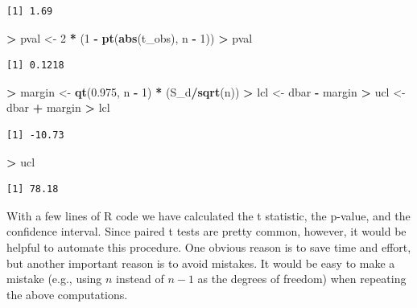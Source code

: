\documentclass[]{krantz}
\makeatletter
\newenvironment{Shaded}{\begin{snugshade}}{\end{snugshade}}
\newcommand{\DecValTok}[1]{\textcolor[rgb]{0.06,0.06,0.06}{#1}}
\newcommand{\FloatTok}[1]{\textcolor[rgb]{0.06,0.06,0.06}{#1}}
\newcommand{\KeywordTok}[1]{\textcolor[rgb]{0.27,0.27,0.27}{\textbf{#1}}}
\newcommand{\NormalTok}[1]{#1}
\newcommand{\OperatorTok}[1]{\textcolor[rgb]{0.43,0.43,0.43}{\textbf{#1}}}
\newcommand{\StringTok}[1]{\textcolor[rgb]{0.5,0.5,0.5}{#1}}
\newenvironment{kframe}{%
\medskip{}
\setlength{\fboxsep}{.8em}
 \def\at@end@of@kframe{}%
 \ifinner\ifhmode%
  \def\at@end@of@kframe{\end{minipage}}%
  \begin{minipage}{\columnwidth}%
 \fi\fi%
 \def\FrameCommand##1{\hskip\@totalleftmargin \hskip-\fboxsep
 \colorbox{shadecolor}{##1}\hskip-\fboxsep
     \hskip-\linewidth \hskip-\@totalleftmargin \hskip\columnwidth}%
 \MakeFramed {\advance\hsize-\width
   \@totalleftmargin\z@ \linewidth\hsize
   \@setminipage}}%
 {\par\unskip\endMakeFramed%
 \at@end@of@kframe}
\renewenvironment{Shaded}{\begin{kframe}}{\end{kframe}}
\makeatother
\begin{document}
\begin{verbatim}
[1] 1.69
\end{verbatim}

\begin{Shaded}
\begin{Highlighting}[]
\OperatorTok{>}\StringTok{ }\NormalTok{pval <-}\StringTok{ }\DecValTok{2} \OperatorTok{*}\StringTok{ }\NormalTok{(}\DecValTok{1} \OperatorTok{-}\StringTok{ }\KeywordTok{pt}\NormalTok{(}\KeywordTok{abs}\NormalTok{(t_obs), n }\OperatorTok{-}\StringTok{ }\DecValTok{1}\NormalTok{))}
\OperatorTok{>}\StringTok{ }\NormalTok{pval}
\end{Highlighting}
\end{Shaded}

\begin{verbatim}
[1] 0.1218
\end{verbatim}

\begin{Shaded}
\begin{Highlighting}[]
\OperatorTok{>}\StringTok{ }\NormalTok{margin <-}\StringTok{ }\KeywordTok{qt}\NormalTok{(}\FloatTok{0.975}\NormalTok{, n }\OperatorTok{-}\StringTok{ }\DecValTok{1}\NormalTok{) }\OperatorTok{*}\StringTok{ }\NormalTok{(S_d}\OperatorTok{/}\KeywordTok{sqrt}\NormalTok{(n))}
\OperatorTok{>}\StringTok{ }\NormalTok{lcl <-}\StringTok{ }\NormalTok{dbar }\OperatorTok{-}\StringTok{ }\NormalTok{margin}
\OperatorTok{>}\StringTok{ }\NormalTok{ucl <-}\StringTok{ }\NormalTok{dbar }\OperatorTok{+}\StringTok{ }\NormalTok{margin}
\OperatorTok{>}\StringTok{ }\NormalTok{lcl}
\end{Highlighting}
\end{Shaded}

\begin{verbatim}
[1] -10.73
\end{verbatim}

\begin{Shaded}
\begin{Highlighting}[]
\OperatorTok{>}\StringTok{ }\NormalTok{ucl}
\end{Highlighting}
\end{Shaded}

\begin{verbatim}
[1] 78.18
\end{verbatim}

With a few lines of R code we have calculated the t statistic, the p-value, and the confidence interval. Since paired t tests are pretty common, however, it would be helpful to automate this procedure. One obvious reason is to save time and effort, but another important reason is to avoid mistakes. It would be easy to make a mistake (e.g., using \(n\) instead of \(n-1\) as the degrees of freedom) when repeating the above computations.
\end{document}
